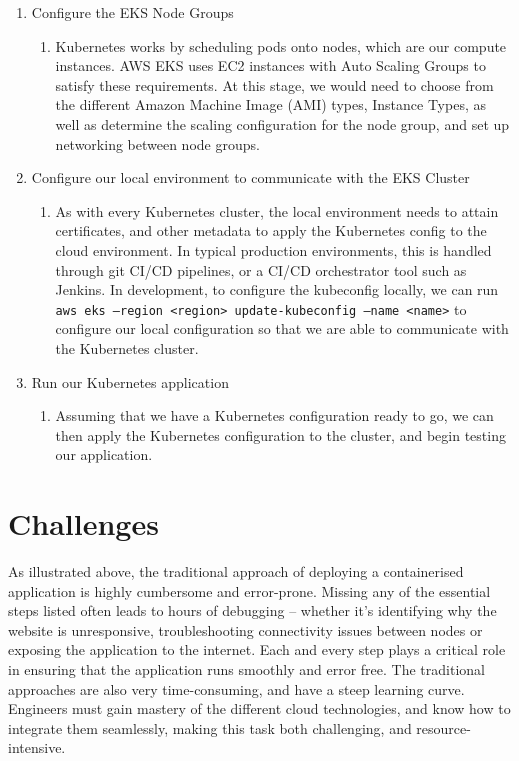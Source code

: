\begin{enumerate}
\begin{enumerate}
\begin{enumerate}
            \item Choose from a wide selection of AWS add-ons (Appendix \ref{appendix:aws-eks-addons}). This is required for configuring ingress controllers, integrating with external file systems, etc. 
            \end{enumerate}
        \end{enumerate}
    \item Configure the EKS Node Groups
        \begin{enumerate}
        \item Kubernetes works by scheduling pods onto nodes, which are our compute instances. AWS EKS uses EC2 instances with Auto Scaling Groups to satisfy these requirements. At this stage, we would need to choose from the different Amazon Machine Image (AMI) types, Instance Types, as well as determine the scaling configuration for the node group, and set up networking between node groups. 
        \end{enumerate}
    \item Configure our local environment to communicate with the EKS Cluster
        \begin{enumerate}
        \item As with every Kubernetes cluster, the local environment needs to attain certificates, and other metadata to apply the Kubernetes config to the cloud environment. In typical production environments, this is handled through git CI/CD pipelines, or a CI/CD orchestrator tool such as Jenkins. In development, to configure the kubeconfig locally, we can run \texttt{aws eks --region <region> update-kubeconfig --name <name>} to configure our local configuration so that we are able to communicate with the Kubernetes cluster.
        \end{enumerate}
    \item Run our Kubernetes application
        \begin{enumerate}
        \item Assuming that we have a Kubernetes configuration ready to go, we can then apply the Kubernetes configuration to the cluster, and begin testing our application. 
        \end{enumerate}
\end{enumerate}

\section{Challenges}
As illustrated above, the traditional approach of deploying a containerised application is highly cumbersome and error-prone. Missing any of the essential steps listed often leads to hours of debugging – whether it’s identifying why the website is unresponsive, troubleshooting connectivity issues between nodes or exposing the application to the internet. Each and every step plays a critical role in ensuring that the application runs smoothly and error free. The traditional approaches are also very time-consuming, and have a steep learning curve. Engineers must gain mastery of the different cloud technologies, and know how to integrate them seamlessly, making this task both challenging, and resource-intensive.  

